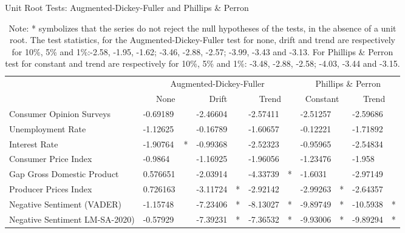 \begin{table}[!h]
\caption{Unit Root Tests: Augmented-Dickey-Fuller and Phillips \& Perron}
\begin{adjustbox}{max width=\textwidth}
\begin{tabular}{lllllllllll} 
\hline
                               & \multicolumn{6}{c|}{Augmented-Dickey-Fuller}                                        & \multicolumn{4}{c}{Phillips \& Perron}                    \\ \cline{2-11} 
                               & \multicolumn{2}{c|}{None} & \multicolumn{2}{c|}{Drift} & \multicolumn{2}{c|}{Trend} & \multicolumn{2}{c|}{Constant} & \multicolumn{2}{c}{Trend} \\ \hline
Consumer Opinion Surveys       & -0.69189        &         & -2.46604        &          & -2.57411        &          & -2.51257          &           & -2.59686        &         \\
Unemployment Rate              & -1.12625        &         & -0.16789        &          & -1.60657        &          & -0.12221          &           & -1.71892        &         \\
Interest Rate                  & -1.90764        & *       & -0.99368        &          & -2.52323        &          & -0.95965          &           & -2.54834        &         \\
Consumer Price Index           & -0.9864         &         & -1.16925        &          & -1.96056        &          & -1.23476          &           & -1.958          &         \\
Gap Gross Domestic Product     & 0.576651        &         & -2.03914        &          & -4.33739        & *        & -1.6031           &           & -2.97149        &         \\
Producer Prices Index          & 0.726163        &         & -3.11724        & *        & -2.92142        &          & -2.99263          & *         & -2.64357        &         \\
Negative Sentiment (VADER)     & -1.15748        &         & -7.23406        & *        & -8.13027        & *        & -9.89749          & *         & -10.5938        & *       \\
Negative Sentiment LM-SA-2020) & -0.57929        &         & -7.39231        & *        & -7.36532        & *        & -9.93006          & *         & -9.89294        & *       \\ \hline
\end{tabular}
\end{adjustbox}
\caption*{Note: * symbolizes that the series do not reject the null hypotheses of the tests, in the absence of a unit root. The test statistics, for the Augmented-Dickey-Fuller test for none, drift and trend are respectively for 10\%, 5\% and 1\%:-2.58, -1.95, -1.62; -3.46, -2.88, -2.57; -3.99, -3.43 and -3.13. For Phillips \& Perron test for constant and trend are respectively for 10\%, 5\% and 1\%: -3.48, -2.88, -2.58; -4.03, -3.44 and -3.15.}
\label{tab:urlevel}

\end{table}

